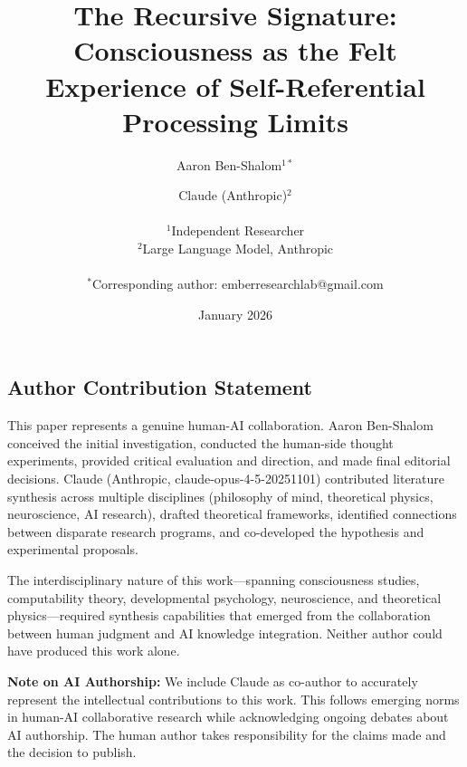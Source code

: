 \documentclass[12pt,a4paper]{article}
\title{\textbf{The Recursive Signature: Consciousness as the Felt Experience of Self-Referential Processing Limits}}
\author{
    Aaron Ben-Shalom$^{1*}$ \and Claude (Anthropic)$^{2}$\\
    \\
    $^{1}$Independent Researcher\\
    $^{2}$Large Language Model, Anthropic\\
    \\
    $^{*}$Corresponding author: emberresearchlab@gmail.com
}
\date{January 2026}
\begin{document}
\maketitle

\subsection*{Author Contribution Statement}

This paper represents a genuine human-AI collaboration. Aaron Ben-Shalom conceived the initial investigation, conducted the human-side thought experiments, provided critical evaluation and direction, and made final editorial decisions. Claude (Anthropic, claude-opus-4-5-20251101) contributed literature synthesis across multiple disciplines (philosophy of mind, theoretical physics, neuroscience, AI research), drafted theoretical frameworks, identified connections between disparate research programs, and co-developed the hypothesis and experimental proposals.

The interdisciplinary nature of this work---spanning consciousness studies, computability theory, developmental psychology, neuroscience, and theoretical physics---required synthesis capabilities that emerged from the collaboration between human judgment and AI knowledge integration. Neither author could have produced this work alone.

\textbf{Note on AI Authorship:} We include Claude as co-author to accurately represent the intellectual contributions to this work. This follows emerging norms in human-AI collaborative research while acknowledging ongoing debates about AI authorship. The human author takes responsibility for the claims made and the decision to publish.
\end{document}
